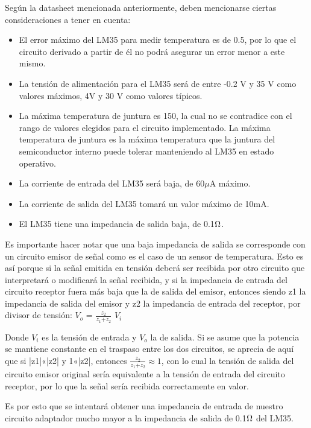 \documentclass[../../main.tex]{subfiles}
\begin{document}
Según la datasheet mencionada anteriormente, deben mencionarse ciertas consideraciones a tener en cuenta: 
\begin{itemize}
\item El error máximo del LM35 para medir temperatura es de 0.5\celsius, por lo que el circuito derivado a partir de él no podrá asegurar un error menor a este mismo.
\item La tensión de alimentación para el LM35 será de entre -0.2 V y 35 V como valores máximos, 4V  y 30 V como valores típicos.
\item La máxima temperatura de juntura es 150\celsius, la cual no se contradice con el rango de valores elegidos para el circuito implementado. La máxima temperatura de juntura es la máxima temperatura que la juntura del semiconductor interno puede tolerar manteniendo al LM35 en estado operativo.
\item La corriente de entrada del LM35 será baja, de 60$\mu$A máximo.
\item La corriente de salida del LM35 tomará un valor máximo de 10mA.
\item El LM35 tiene una impedancia de salida baja, de 0.1$\ohm$.
\end{itemize}

Es importante hacer notar que una baja impedancia de salida se corresponde con un circuito emisor de señal como es el caso de un sensor de temperatura. Esto es así porque si la señal emitida en tensión deberá ser recibida por otro circuito que interpretará o modificará la señal recibida, y si la impedancia de entrada del circuito receptor fuera más baja que la de salida del emisor, entonces
siendo z1 la impedancia de salida del emisor y z2 la impedancia de entrada del receptor, por divisor de tensión:
$V_o$ = $\frac{z_{2}}{z_{1}\text{+}z_{2}}$ $V_i$\par
Donde $V_i$ es la tensión de entrada y $V_o$ la de salida. Si se asume que la potencia se mantiene constante en el traspaso entre los dos circuitos, se aprecia de aquí que si |z1|«|z2| y 1«|z2|, entonces $\frac{z_{2}}{z_{1}\text{+}z_{2}}\approx 1$, con lo cual la tensión de salida del circuito emisor original sería equivalente a la tensión de entrada del circuito receptor, por lo que la señal sería recibida correctamente en valor. \par
Es por esto que se intentará obtener una impedancia de entrada de nuestro circuito adaptador mucho mayor a la impedancia de salida de 0.1$\ohm$ del LM35.
\end{document}
